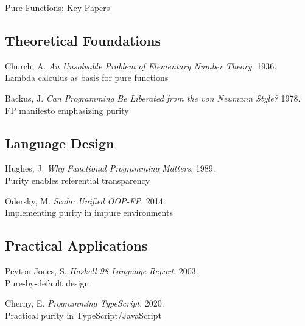 \documentclass{beamer}
\begin{document}
\begin{frame}{Pure Functions: Key Papers}
\footnotesize

\begin{thebibliography}{9}
\beamertemplatetextbibitems

\subsection*{Theoretical Foundations}
\textcolor{pureblue}{Church, A.} 
\textit{An Unsolvable Problem of Elementary Number Theory}. 1936.
\footnotesize{\\ \color{gray}Lambda calculus as basis for pure functions}

\textcolor{pureblue}{Backus, J.} 
\textit{Can Programming Be Liberated from the von Neumann Style?} 1978.
\footnotesize{\\ \color{gray}FP manifesto emphasizing purity}

\subsection*{Language Design}
\textcolor{pureblue}{Hughes, J.} 
\textit{Why Functional Programming Matters}. 1989.
\footnotesize{\\ \color{gray}Purity enables referential transparency}

\textcolor{pureblue}{Odersky, M.} 
\textit{Scala: Unified OOP-FP}. 2014.
\footnotesize{\\ \color{gray}Implementing purity in impure environments}

\subsection*{Practical Applications}
\textcolor{pureblue}{Peyton Jones, S.} 
\textit{Haskell 98 Language Report}. 2003.
\footnotesize{\\ \color{gray}Pure-by-default design}

\textcolor{pureblue}{Cherny, E.} 
\textit{Programming TypeScript}. 2020.
\footnotesize{\\ \color{gray}Practical purity in TypeScript/JavaScript}


\end{thebibliography}

\end{frame}
\end{document}
